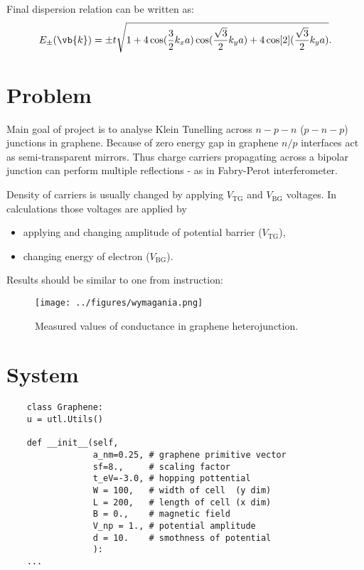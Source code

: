 \documentclass{beamer}
\begin{document}
\begin{frame}
	Final dispersion relation can be written as:
	\begin{equation}
		E_{\pm}(\vb{k}) = \pm t \sqrt{1 + 4\cos(\frac{3}{2}k_x a)\cos(\frac{\sqrt{3}}{2}k_y a) + 4 \cos[2](\frac{\sqrt{3}}{2}k_y a)}.
	\end{equation}
\end{frame}

\section{Problem}

\begin{frame}
	Main goal of project is to analyse Klein Tunelling across $n - p - n$ ($p - n - p$) junctions in graphene.
	Because of zero energy gap in graphene $n / p$ interfaces act as semi-transparent mirrors.
	Thus charge carriers propagating across a bipolar junction can perform multiple reflections - as in Fabry-Perot interferometer.

	Density of carriers is usually changed by applying $V_{\text{TG}}$ and $V_{\text{BG}}$ voltages.
	In calculations those voltages are applied by
	\begin{itemize}
		\item applying and changing amplitude of potential barrier ($V_{\text{TG}}$),
		\item changing energy of electron ($V_{\text{BG}}$).
	\end{itemize}
\end{frame}


\begin{frame}
	Results should be similar to one from instruction:
	\begin{figure}
		\centering
		\texttt{[image: ../figures/wymagania.png]}
		\caption{Measured values of conductance in graphene heterojunction.}
	\end{figure}

\end{frame}

\section{System}

\begin{frame}[fragile]
	\begin{verbatim}
    class Graphene:
    u = utl.Utils()

    def __init__(self, 
                 a_nm=0.25, # graphene primitive vector
                 sf=8.,     # scaling factor
                 t_eV=-3.0, # hopping pottential
                 W = 100,   # width of cell  (y dim)
                 L = 200,   # length of cell (x dim)
                 B = 0.,    # magnetic field
                 V_np = 1., # potential amplitude
                 d = 10.    # smothness of potential
                 ):    
    ...
    \end{verbatim}
\end{frame}
\end{document}
